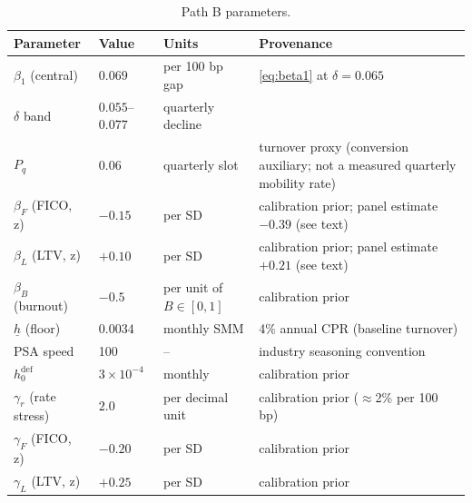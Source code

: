 \documentclass[12pt]{article}
\begin{document}
\begin{table}[H]
\centering
\footnotesize
\setlength{\tabcolsep}{4pt}
\begin{threeparttable}
\caption{Path B parameters.}
\label{tab:params}
\begin{tabular}{@{}llll@{}}
\toprule
Parameter & Value & Units & Provenance \\
\midrule
$\beta_1$ (central) & $0.069$ & per 100 bp gap & \eqref{eq:beta1} at $\delta = 0.065$ \citep{liebersohn2024} \\
$\delta$ band & $0.055$--$0.077$ & quarterly decline & \citet{liebersohn2024} \\
$P_q$ & $0.06$ & quarterly slot & turnover proxy (conversion auxiliary; not a measured quarterly mobility rate) \\
$\beta_F$ (FICO, z) & $-0.15$ & per SD & calibration prior; panel estimate $-0.39$ (see text) \\
$\beta_L$ (LTV, z) & $+0.10$ & per SD & calibration prior; panel estimate $+0.21$ (see text) \\
$\beta_B$ (burnout) & $-0.5$ & per unit of $B \in [0,1]$ & calibration prior \\
$\underline{h}$ (floor) & $0.0034$ & monthly SMM & 4\% annual CPR (baseline turnover) \\
PSA speed & 100 & -- & industry seasoning convention \\
$h^{\mathrm{def}}_0$ & $3\times10^{-4}$ & monthly & calibration prior \\
$\gamma_r$ (rate stress) & $2.0$ & per decimal unit & calibration prior ($\approx$2\% per 100 bp) \\
$\gamma_F$ (FICO, z) & $-0.20$ & per SD & calibration prior \\
$\gamma_L$ (LTV, z) & $+0.25$ & per SD & calibration prior \\
\bottomrule
\end{tabular}
\end{threeparttable}
\end{table}
\end{document}
